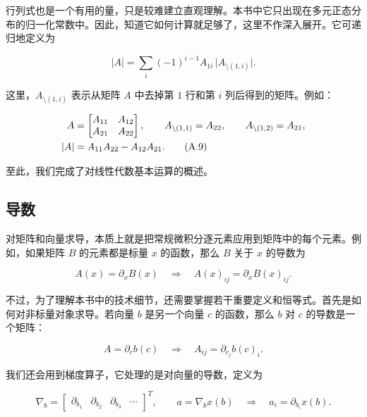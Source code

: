 行列式也是一个有用的量，只是较难建立直观理解。本书中它只出现在多元正态分布的归一化常数中。因此，知道它如何计算就足够了，这里不作深入展开。它可递归地定义为

\begin{equation}
|A| = \sum_i (-1)^{i-1} A_{1i} \, \big|A_{\setminus(1,i)}\big|.
\tag{A.8}
\end{equation}

这里，$A_{\setminus(1,i)}$ 表示从矩阵 $A$ 中去掉第 $1$ 行和第 $i$ 列后得到的矩阵。例如：

\begin{align}
A &=
\begin{bmatrix}
A_{11} & A_{12} \\
A_{21} & A_{22}
\end{bmatrix},
\qquad
A_{\setminus(1,1)} = A_{22},
\qquad
A_{\setminus(1,2)} = A_{21},
\notag \\
|A|
&= A_{11} A_{22} - A_{12} A_{21}.
\tag{A.9}
\end{align}

至此，我们完成了对线性代数基本运算的概述。

\subsection{导数}

对矩阵和向量求导，本质上就是把常规微积分逐元素应用到矩阵中的每个元素。例如，如果矩阵 $B$ 的元素都是标量 $x$ 的函数，那么 $B$ 关于 $x$ 的导数为

\begin{equation}
A(x) = \partial_x B(x)
\quad\Rightarrow\quad
A(x)_{ij} = \partial_x B(x)_{ij}.
\tag{A.10}
\end{equation}

不过，为了理解本书中的技术细节，还需要掌握若干重要定义和恒等式。首先是如何对非标量对象求导。若向量 $b$ 是另一个向量 $c$ 的函数，那么 $b$ 对 $c$ 的导数是一个矩阵：

\begin{equation}
A = \partial_c b(c)
\quad\Rightarrow\quad
A_{ij} = \partial_{c_j} b(c)_i.
\tag{A.11}
\end{equation}

我们还会用到梯度算子，它处理的是对向量的导数，定义为

\begin{equation}
\nabla_b =
\begin{bmatrix}
\partial_{b_1} & \partial_{b_2} & \partial_{b_3} & \cdots
\end{bmatrix}^T,
\qquad
a = \nabla_b x(b)
\quad\Rightarrow\quad
a_i = \partial_{b_i} x(b).
\tag{A.12}
\end{equation}

